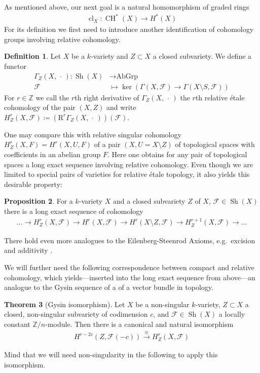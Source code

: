 \documentclass[english]{scrartcl}
\theoremstyle{definition}
\newtheorem{Def}{Definition}[section]
\newtheorem{Prop}[Def]{Proposition}
\newtheorem{Thm}[Def]{Theorem}
\theoremstyle{remark}
\newcommand*{\Z}{\mathds{Z}}
\newcommand*{\Zmod}[1]{\Z/#1} %
\newcommand*{\F}{\mathcal{F}} %
\DeclareMathOperator{\Sh}{Sh} %
\newcommand*{\forexample}{e.g.\ }
\newcommand*{\argreplacement}{\,\cdot\,} %
\DeclareMathOperator{\CH}{CH} %
\DeclareMathOperator{\CL}{cl} %
\begin{document}
As mentioned above, our next goal is a natural homomorphism of graded rings
\begin{gather*}
  \CL_X\colon \CH^*(X)\rightarrow H^*(X)
\end{gather*}
For its definition we first need to introduce another identification
of cohomology groups involving relative cohomology.

\begin{Def}\label{def:relcoh}
  Let $X$ be a $k$-variety and $Z\subset X$ a closed subvariety.
  We define a functor
  \begin{align*}
    \Gamma_Z(X,\argreplacement) \colon \Sh(X) &\rightarrow \text{AbGrp}\\
    \F &\longmapsto \ker\left(\Gamma(X,\F)\to \Gamma(X\setminus S,\F)\right)
  \end{align*}
  For $r\in\Z$ we call the $r$th right derivative of
  $\Gamma_Z(X,\argreplacement)$ the $r$th relative étale cohomology of the pair
  $(X,Z)$ and write
  $H_Z^r(X,\F)\coloneqq\left(\mathrm R^r\Gamma_Z(X,\argreplacement)\right)(\F)$.
\end{Def}
One may compare this with relative singular cohomology $H_Z^r(X,F)=H^r(X,U,F)$
of a pair $(X,U=X\setminus Z)$ of topological spaces with coefficients
in an abelian group $F$. Here one obtains for any pair of topological
spaces a long exact sequence involving relative cohomology.
Even though we are limited to special pairs of varieties for relative
étale topology, it also yields this desirable property:
\begin{Prop}\label{lesrelcoh}
  For a $k$-variety $X$ and a closed subvariety $Z$ of $X$,
  $\F\in\Sh(X)$ there is a long exact sequence of cohomology
  \begin{gather*}
    \dotsc
    \to H_Z^r(X,\F)
    \to H^r(X,\F)
    \to H^r(X\setminus Z,\F)
    \to H_Z^{r+1}(X,\F)
    \to \dotsc
  \end{gather*}
\end{Prop}
There hold even more analogues to the Eilenberg-Steenrod Axioms,
\forexample excision and additivity \cite[compare][Chap.~9]{milne}.

We will further need the following correspondence between compact and
relative cohomology, which yields---inserted into the long exact
sequence from above---an analogue to the Gysin sequence of a of a
vector bundle in topology.
\begin{Thm}[Gysin isomorphism]\label{gysiniso}
  Let $X$ be a non-singular $k$-variety,
  $Z\subset X$ a closed, non-singular subvariety of codimension $c$,
  and $\F\in\Sh(X)$ a locally constant $\Zmod{n}$-module.
  Then there is a canonical and natural isomorphism
  \begin{gather*}
    H^{r-2c}\left(Z,\F(-c)\right)
    \xrightarrow{\cong}
    H_Z^r\left(X,\F\right)
  \end{gather*}
\end{Thm}
Mind that we will need non-singularity in the following to apply this
isomorphism.
\end{document}
